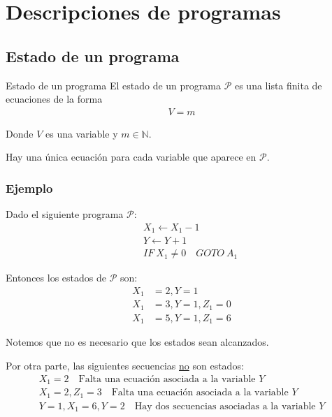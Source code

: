 \section{Descripciones de programas}

\subsection{Estado de un programa}

\begin{definicion}{Estado de un programa}{}
    El estado de un programa $\mathcal{P}$ es una lista finita de ecuaciones 
    de la forma
    \begin{gather*}
        V = m
    \end{gather*}

    Donde $V$ es una variable y $m \in \mathbb{N}$.

    \medskip

    Hay una única ecuación para cada variable que aparece en $\mathcal{P}$.
\end{definicion}

\subsubsection{Ejemplo}

Dado el siguiente programa $\mathcal{P}$:
\begin{align*}
    [A_1] \quad &X_1 \gets X_1 - 1 \\
                &Y \gets Y + 1 \\
                &IF ~ X_1 \neq 0 \quad GOTO ~ A_1
\end{align*}

Entonces los estados de $\mathcal{P}$ son:
\begin{align*}
    X_1 &= 2, Y = 1 \\
    X_1 &= 3, Y = 1, Z_1 = 0 \\
    X_1 &= 5, Y = 1, Z_1 = 6
\end{align*}

Notemos que no es necesario que los estados sean alcanzados.

\medskip

Por otra parte, las siguientes secuencias \underline{no} son estados:
\begin{align*}
    X_1 = 2 \quad \text{Falta una ecuación asociada a la variable } Y \\
    X_1 = 2, Z_1 = 3 \quad \text{Falta una ecuación asociada a la 
    variable } Y \\
    Y = 1, X_1 = 6, Y = 2 \quad \text{Hay dos secuencias asociadas a la 
    variable } Y
\end{align*}

